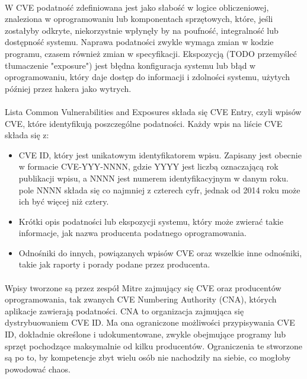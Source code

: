 \documentclass[a4paper,12pt,twoside]{article}
\begin{document}
\paragraph{}
W CVE podatność zdefiniowana jest jako słabość w logice obliczeniowej, znaleziona w oprogramowaniu lub komponentach sprzętowych, które, jeśli zostałyby odkryte, niekorzystnie wpłynęły by na poufność, integralność lub dostępność systemu. Naprawa podatności zwykle wymaga zmian w kodzie programu, czasem również zmian w specyfikacji. Ekspozycją (TODO przemyśleć tłumaczenie "exposure") jest błędna konfiguracja systemu lub błąd w oprogramowaniu, który daje dostęp do informacji i zdolności systemu, użytych później przez hakera jako wytrych\cite{cve_mitre_terms}.   
\paragraph{}
Lista Common Vulnerabilities and Exposures składa się CVE Entry, czyli wpisów CVE, które identyfikują poszczególne podatności. \newline Każdy wpis na liście CVE składa się z:
\begin{itemize}
\item CVE ID, który jest unikatowym identyfikatorem wpisu. Zapisany jest obecnie w formacie CVE-YYY-NNNN, gdzie YYYY jest liczbą oznaczającą rok publikacji wpisu, a NNNN jest numerem identyfikacyjnym w danym roku. pole NNNN składa się co najmniej z czterech cyfr, jednak od 2014 roku może ich być więcej niż cztery.
\item Krótki opis podatności lub ekspozycji systemu, który może zwierać takie informacje, jak nazwa producenta podatnego oprogramowania.
\item Odnośniki do innych, powiązanych wpisów CVE oraz wszelkie inne odnośniki, takie jak raporty i porady podane przez producenta.
\end{itemize}
\paragraph{}
Wpisy tworzone są przez zespół Mitre zajmujący się CVE oraz producentów oprogramowania, tak zwanych CVE Numbering Authority (CNA), których aplikacje zawierają podatności. CNA to organizacja zajmująca się dystrybuowaniem CVE ID. Ma ona ograniczone możliwości przypisywania CVE ID, dokładnie określone i udokumentowane, zwykle obejmujące programy lub sprzęt pochodzące maksymalnie od kilku producentów. Ograniczenia te stworzone są po to, by kompetencje zbyt wielu osób nie nachodziły na siebie, co mogłoby powodować chaos\cite{cve_mitre_cna_doc}.
\end{document}
